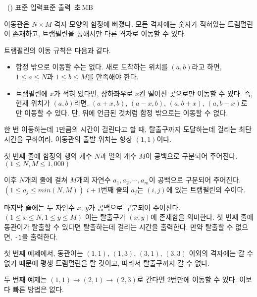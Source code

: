 \begin{problem}{\kcpcprobtrap\ (\kcpcprobtrapshort)}
    {표준 입력}{표준 출력}
    {\kcpcprobtraptime\,초}{\kcpcprobtrapmemory\,MB}{}
    
    이동관은 $ N \times M$ 격자 모양의 함정에 빠졌다. 모든 격자에는 숫자가 적혀있는 트램펄린이 존재하고, 트램펄린을 통해서만 다른 격자로 이동할 수 있다.
    
    트램펄린의 이동 규칙은 다음과 같다.
    
    \begin{itemize}
        \item 함정 밖으로 이동할 수는 없다. 새로 도착하는 위치를 $(a, b)$라고 하면, $1 \leq a \leq N$과 $1 \leq b \leq M$를 만족해야 한다.
        \item 트램펄린에 $ x $가 적혀 있다면, 상하좌우로 $ x $칸 떨어진 곳으로만 이동할 수 있다. 즉, 현재 위치가 $(a, b)$라면, $(a+x, b)$, $(a-x, b)$, $(a, b+x)$, $(a, b-x)$로만 이동할 수 있다. 단, 위에 언급된 것처럼 함정 밖으로는 이동할 수 없다.
    \end{itemize}
    
    한 번 이동하는데 1만큼의 시간이 걸린다고 할 때, 탈출구까지 도달하는데 걸리는 최단 시간을 구하여라. 이동관의 출발 위치는 항상 $(1, 1)$이다.
    
    \InputFile
    첫 번째 줄에 함정의 행의 개수 $ N $과 열의 개수 $ M $이 공백으로 구분되어 주어진다. $( 1 \leq N, M \leq 1,000 ) $
    
    이후 $N$개의 줄에 걸쳐 $M$개의 자연수 $a_{1}, a_{2}, \cdots, a_{m}$이 공백으로 구분되어 주어진다. $ (1 \leq a_{j} \leq min(N,M)) $ $i+1$번째 줄의 $a_{j}$는 $ (i, j) $에 있는 트램펄린의 수이다.
    
    마지막 줄에는 두 자연수 $x$, $y$가 공백으로 구분되어 주어진다. $(1 \leq x \leq N, 1 \leq y \leq M) $ 이는 탈출구가 $ (x, y) $에 존재함을 의미한다. 
    \OutputFile
    첫 번째 줄에 동관이가 탈출할 수 있다면 탈출하는데 걸리는 시간을 출력한다. 만약 탈출할 수 없으면, \texttt{-1}을 출력한다.
   
    \Examples
    
    \begin{example}
    \end{example}
    
    \Explanation
    첫 번째 예제에서, 동관이는 $ (1,1) $, $ (1,3) $, $ (3,1) $, $ (3,3) $ 이외의 격자에는 갈 수 없기 때문에 평생 트램펄린을 탈 것이고, 따라서 탈출구까지 갈 수 없다.
    
    두 번째 예제는 $ (1,1) \rightarrow (2,1) \rightarrow (2,3)$로 간다면 2번만에 이동할 수 있다. 이보다 빠른 방법은 없다.
    
    
\end{problem}

